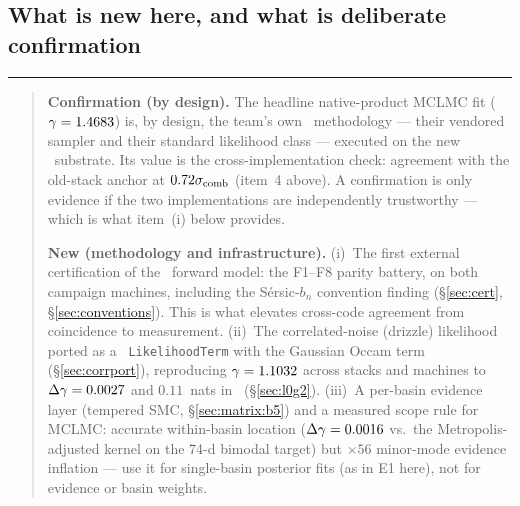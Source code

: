 \medskip
\noindent\begin{minipage}{\linewidth}
\subsection*{What is new here, and what is deliberate confirmation}

\noindent\rule{\linewidth}{0.8pt}
\begin{quote}\footnotesize
\textbf{Confirmation (by design).} The headline native-product MCLMC fit
($\gamma=1.4683$) is, by design, the team's own \gigalens\ methodology
--- their vendored sampler and their standard likelihood class --- executed
on the new \sceneapi\ substrate. Its value is the cross-implementation
check: agreement with the old-stack anchor at $0.72\sigma_{\rm comb}$
(item~4 above). A confirmation is only evidence if the two implementations
are independently trustworthy --- which is what item~(i) below provides.

\textbf{New (methodology and infrastructure).} (i)~The first external
certification of the \sceneapi\ forward model: the F1--F8 parity battery,
on both campaign machines, including the S\'ersic-$b_n$ convention finding
(\S\ref{sec:cert}, \S\ref{sec:conventions}). This is what elevates
cross-code agreement from coincidence to measurement. (ii)~The
correlated-noise (drizzle) likelihood ported as a \sceneapi\
\texttt{LikelihoodTerm} with the Gaussian Occam term
(\S\ref{sec:corrport}), reproducing $\gamma=1.1032$ across stacks and
machines to $\Delta\gamma=0.0027$ and $0.11$~nats in \logZ\
(\S\ref{sec:l0g2}). (iii)~A per-basin evidence layer (tempered SMC,
\S\ref{sec:matrix:b5}) and a measured scope rule for MCLMC: accurate
within-basin location ($\Delta\gamma=0.0016$ vs.\ the
Metropolis-adjusted kernel on the 74-d bimodal target) but $\times56$
minor-mode evidence inflation --- use it for single-basin posterior fits
(as in E1 here), not for evidence or basin weights.


\end{quote}
\end{minipage}

